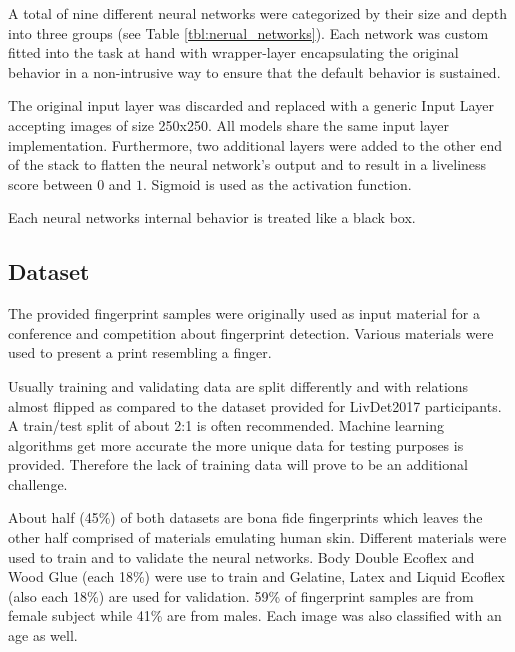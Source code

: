 


A total of nine different neural networks were categorized by their size and depth into three groups (see Table \ref{tbl:nerual_networks}).
Each network was custom fitted into the task at hand with wrapper-layer encapsulating the original behavior in a non-intrusive way to ensure that the default behavior is sustained.

The original input layer was discarded and replaced with a generic Input Layer accepting images of size 250x250. All models share the same input layer implementation.
Furthermore, two additional layers were added to the other end of the stack to flatten the neural network's output and to result in a liveliness score between $0$ and $1$.
Sigmoid is used as the activation function.

Each neural networks internal behavior is treated like a black box.



\subsection{Dataset}
The provided fingerprint samples were originally used as input material for a conference and competition about fingerprint detection. Various materials were used to present a print resembling a finger.





Usually training and validating data are split differently and with relations almost flipped as compared to the dataset provided for LivDet2017 participants.
A train/test split of about 2:1 is often recommended.
Machine learning algorithms get more accurate the more unique data for testing purposes is provided.
Therefore the lack of training data will prove to be an additional challenge.





About half (45\%) of both datasets are bona fide fingerprints which leaves the other half comprised of materials emulating human skin.
Different materials were used to train and to validate the neural networks.
Body Double Ecoflex and Wood Glue (each 18\%) were use to train and Gelatine, Latex and Liquid Ecoflex (also each 18\%) are used for validation.
59\% of fingerprint samples are from female subject while 41\% are from males.
Each image was also classified with an age as well.






